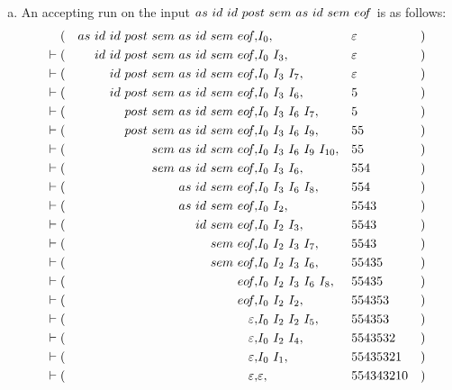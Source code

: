 \begin{solution}
\begin{enumerate}[(a)]
    \item An accepting run on the input $as\ id\ id\ post\ sem\ as\ id\ sem\ \eof$ is as follows:
    \begin{align*}
      (&& as\ id\ id\ post\ sem\ as\ id\ sem\ \eof, &I_0, &&\varepsilon &)\\
      \vdash (&& id\ id\ post\ sem\ as\ id\ sem\ \eof, &I_0\ I_3, &&\varepsilon &)\\
      \vdash (&& id\ post\ sem\ as\ id\ sem\ \eof, &I_0\ I_3\ I_7, &&\varepsilon &)\\
      \vdash (&& id\ post\ sem\ as\ id\ sem\ \eof, &I_0\ I_3\ I_6, && 5 &)\\
      \vdash (&& post\ sem\ as\ id\ sem\ \eof, &I_0\ I_3\ I_6\ I_7, && 5 &)\\
      \vdash (&& post\ sem\ as\ id\ sem\ \eof, &I_0\ I_3\ I_6\ I_9, && 55 &)\\
      \vdash (&& sem\ as\ id\ sem\ \eof, &I_0\ I_3\ I_6\ I_9\ I_{10}, && 55 &)\\
      \vdash (&& sem\ as\ id\ sem\ \eof, &I_0\ I_3\ I_6, && 554 &)\\
      \vdash (&& as\ id\ sem\ \eof, &I_0\ I_3\ I_6\ I_8, && 554 &)\\
      \vdash (&& as\ id\ sem\ \eof, &I_0\ I_2, && 5543 &)\\
      \vdash (&& id\ sem\ \eof, &I_0\ I_2\ I_3, && 5543 &)\\
      \vdash (&& sem\ \eof, &I_0\ I_2\ I_3\ I_7, && 5543 &)\\
      \vdash (&& sem\ \eof, &I_0\ I_2\ I_3\ I_6, && 55435 &)\\
      \vdash (&& \eof, &I_0\ I_2\ I_3\ I_6\ I_8, && 55435 &)\\
      \vdash (&& \eof, &I_0\ I_2\ I_2, && 554353 &)\\
      \vdash (&& \varepsilon, &I_0\ I_2\ I_2\ I_5, && 554353 &)\\
      \vdash (&& \varepsilon, &I_0\ I_2\ I_4, && 5543532 &)\\
      \vdash (&& \varepsilon, &I_0\ I_1, && 55435321 &)\\
      \vdash (&& \varepsilon, &\varepsilon, && 554343210 &)\\
    \end{align*}
\end{enumerate}
\end{solution}
